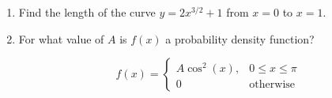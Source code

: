 \documentclass[12pt]{article}
\begin{document}
\begin{enumerate}
\item

Find the length of the curve $y=2x^{3/2}+1$ from $x=0$ to $x=1$.

\vspace{3in}
\item

For what value of $A$ is $f(x)$ a probability density function?

$$f(x) = \left\lbrace\begin{array}{cc}
A\cos^2(x), &  0\leq x \leq \pi\\
0 & \text{otherwise}\end{array}\right.$$

\end{enumerate}
\end{document}
